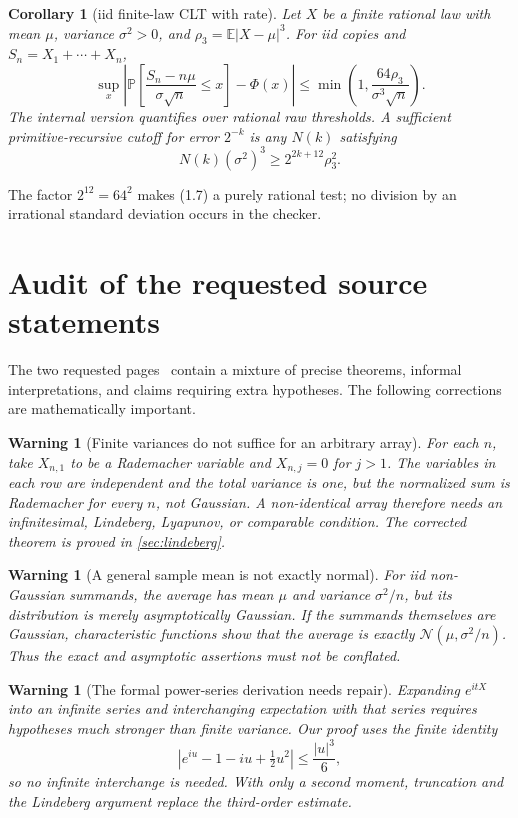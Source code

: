 \documentclass[11pt]{article}
\newtheorem{corollary}[theorem]{Corollary}
\newtheorem{warning}[theorem]{Warning}
\newcommand{\E}{\mathbb E}
\newcommand{\Pp}{\mathbb P}
\newcommand{\PhiN}{\Phi}
\newcommand{\abs}[1]{\left|#1\right|}
\begin{document}
\begin{corollary}[iid finite-law CLT with rate]\label{cor:iid-rate}
Let \(X\) be a finite rational law with mean \(\mu\), variance
\(\sigma^2>0\), and \(\rho_3=\E|X-\mu|^3\).  For iid copies and
\(S_n=X_1+\cdots+X_n\),
\[
 \sup_x\abs{\Pp\!\left[\frac{S_n-n\mu}{\sigma\sqrt n}\le x\right]
                 -\PhiN(x)}
 \le \min\!\left(1,\frac{64\rho_3}{\sigma^3\sqrt n}\right). \tag{1.6}
\]
The internal version quantifies over rational raw thresholds.  A sufficient
primitive-recursive cutoff for error \(2^{-k}\) is any \(N(k)\) satisfying
\[
 N(k)(\sigma^2)^3\ge 2^{2k+12}\rho_3^2.                \tag{1.7}
\]
\end{corollary}

The factor \(2^{12}=64^2\) makes (1.7) a purely rational test; no division by
an irrational standard deviation occurs in the checker.

\section{Audit of the requested source statements}

The two requested pages~\cite{WikipediaCLT,MathWorldCLT} contain a mixture of precise theorems, informal
interpretations, and claims requiring extra hypotheses.  The following
corrections are mathematically important.

\begin{warning}[Finite variances do not suffice for an arbitrary array]
For each \(n\), take \(X_{n,1}\) to be a Rademacher variable and
\(X_{n,j}=0\) for \(j>1\).  The variables in each row are independent and the
total variance is one, but the normalized sum is Rademacher for every \(n\),
not Gaussian.  A non-identical array therefore needs an infinitesimal,
Lindeberg, Lyapunov, or comparable condition.  The corrected theorem is
proved in \cref{sec:lindeberg}.
\end{warning}

\begin{warning}[A general sample mean is not exactly normal]
For iid non-Gaussian summands, the average has mean \(\mu\) and variance
\(\sigma^2/n\), but its distribution is merely asymptotically Gaussian.
If the summands themselves are Gaussian, characteristic functions show that
the average is exactly \(\mathcal N(\mu,\sigma^2/n)\).  Thus the exact and
asymptotic assertions must not be conflated.
\end{warning}

\begin{warning}[The formal power-series derivation needs repair]
Expanding \(e^{itX}\) into an infinite series and interchanging expectation
with that series requires hypotheses much stronger than finite variance.
Our proof uses the finite identity
\[
 \abs{e^{iu}-1-iu+\tfrac12u^2}\le \frac{|u|^3}{6},     \tag{2.1}
\]
so no infinite interchange is needed.  With only a second moment, truncation
and the Lindeberg argument replace the third-order estimate.
\end{warning}
\end{document}
